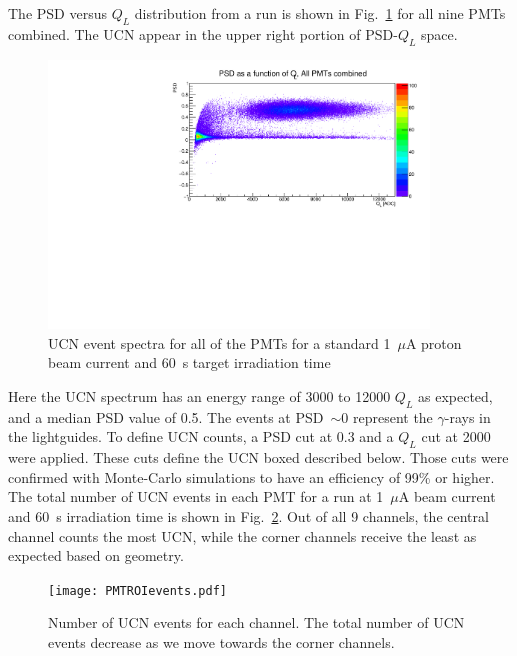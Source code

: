 The PSD versus $Q_L$ distribution from a run is shown in
Fig.~\ref{fig:psd_vs_ql} for all nine PMTs combined. The UCN appear in
the upper right portion of PSD-$Q_L$ space.
\begin{figure}[h!]
  \centering
  \includegraphics[width=0.9\textwidth]{PSD_vs_QL.pdf}
  \caption[UCN event spectra for 1~$\mu$A beam current and 60~s target
  irradiation]{UCN event spectra for all of the PMTs for a standard
    1~$\mu$A proton beam current and 60~s target irradiation time }
  \label{fig:psd_vs_ql}
\end{figure}

Here the UCN spectrum has an energy range of 3000 to 12000 $Q_L$ as
expected, and a median PSD value of 0.5. The events at PSD~$\sim 0$
represent the $\gamma$-rays in the lightguides. To define UCN counts,
a PSD cut at 0.3 and a $Q_L$ cut at 2000 were applied. These cuts
define the UCN boxed described below. Those cuts were confirmed with
Monte-Carlo simulations to have an efficiency of 99\% or higher. The
total number of UCN events in each PMT for a run at 1~$\mu$A beam
current and 60~s irradiation time is shown in
Fig.~\ref{fig:channelcounts}.  Out of all 9 channels, the central
channel counts the most UCN, while the corner channels receive the
least as expected based on geometry.
\begin{figure}[h!]
  \centering \texttt{[image: PMTROIevents.pdf]}
  \caption[UCN events per channel]{Number of UCN events for each
    channel. The total number of UCN events decrease as we move
    towards the corner channels.  }
  \label{fig:channelcounts}
\end{figure}


